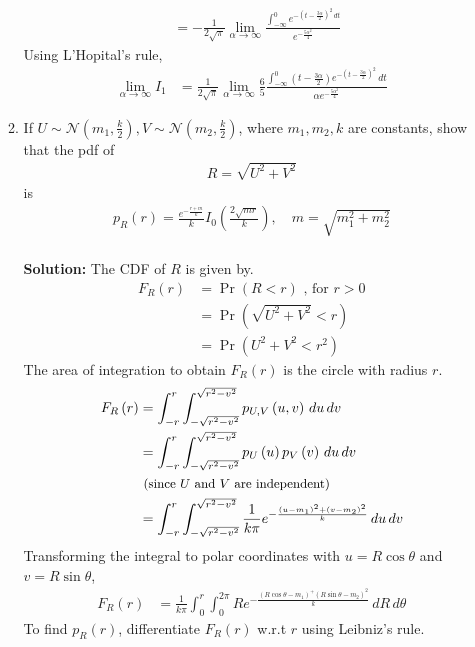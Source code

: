 \documentclass[journal,8pt,onecolumn]{IEEEtran}
\providecommand{\pr}[1]{\ensuremath{\Pr\left(#1\right)}}
\providecommand{\brak}[1]{\ensuremath{\left(#1\right)}}
\newcommand{\solution}{\noindent \textbf{Solution: }}
\begin{document}
\begin{enumerate}
\begin{enumerate}[label=(\alph{enumii})]
\begin{align}
	&= -\frac{1}{2\sqrt{\pi}} \lim_{\alpha \rightarrow \infty} \frac{\int_{-\infty}^{0} e^{-\brak{t-\frac{3\alpha}{2}}^2 \,dt}}{e^{-\frac{5\alpha^2}{4}}}
\end{align}
Using L'Hopital's rule,
\begin{align}
	\lim_{\alpha \rightarrow \infty} I_1 &= \frac{1}{2\sqrt{\pi}} \lim_{\alpha \rightarrow \infty} \frac{6}{5} \frac{\int_{-\infty}^{0} \brak{t-\frac{3\alpha}{2}} e^{-\brak{t-\frac{3\alpha}{2}}^2} \,dt}{\alpha e^{-\frac{5\alpha^2}{4}}}
\end{align}
\item 
If $U\sim\mathcal{N}\brak{m_1,\frac{k}{2}},V\sim\mathcal{N}\brak{m_2,\frac{k}{2}}$, where $m_1,m_2, k$ are constants, show that the pdf of 
%
\begin{align}
R = \sqrt{U^2+V^2}
\end{align}
%
is
%
\begin{align}
\label{eq:general_chi_sq}
p_{R}\brak{r} = \frac{e^{-\frac{r +m}{k}}}{ k}I_{0}\brak{\frac{2\sqrt{mr}}{k}},\quad m = \sqrt{m_1^2+m_2^2}
\end{align}\\
\solution The CDF of $R$ is given by.
\begin{align}
	F_{R}\brak{r} &= \pr{R < r} \text{ , for $r > 0$}\\
	&= \pr{\sqrt{U^2 + V^2} < r}\\
	&= \pr{U^2 + V^2 < r^2}
\end{align}
The area of integration to obtain $F_{R}\brak{r}$ is the circle with radius $r$.
\begin{align}
	F_{R}\brak{r} &= \int_{-r}^{r} \int_{-\sqrt{r^2-v^2}}^{\sqrt{r^2-v^2}} p_{U,V}\brak{u,v}  \,du  \,dv\\
	&= \int_{-r}^{r} \int_{-\sqrt{r^2-v^2}}^{\sqrt{r^2-v^2}} p_{U}\brak{u} p_{V}\brak{v} \,du  \,dv\\
	\nonumber
	&\text{   \small (since $U$ and $V$ are independent)}\\
	&= \int_{-r}^{r} \int_{-\sqrt{r^2-v^2}}^{\sqrt{r^2-v^2}} \frac{1}{k\pi} e^{-\frac{\brak{u-m_1}^2+\brak{v-m_2}^2}{k}} \,du  \,dv
\end{align}
Transforming the integral to polar coordinates with $u=R \cos \theta$ and $v=R \sin \theta$,
\begin{align}
	F_{R}\brak{r} &= \frac{1}{k\pi} \int_{0}^{r} \int_{0}^{2\pi} Re^{-\frac{\brak{R\cos \theta-m_1}^+\brak{R\sin \theta-m_2}^2}{k}} \,dR  \,d\theta  
\end{align}
To find $p_{R}\brak{r}$, differentiate $F_{R}\brak{r}$ w.r.t $r$ using Leibniz's rule.

\end{enumerate}
\end{enumerate}
\end{document}
